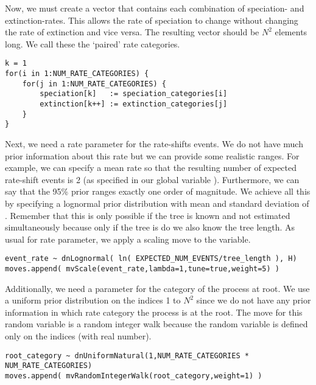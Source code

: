 Now, we must create a vector that contains each combination of speciation- and extinction-rates.
This allows the rate of speciation to change without changing the rate of extinction and vice versa.
The resulting vector should be $N^2$ elements long.
We call these the `paired' rate categories.

{\tt \begin{snugshade*}
\begin{lstlisting}
k = 1
for(i in 1:NUM_RATE_CATEGORIES) {
    for(j in 1:NUM_RATE_CATEGORIES) {
        speciation[k]   := speciation_categories[i]
        extinction[k++] := extinction_categories[j]
    }
}
\end{lstlisting}
\end{snugshade*}}


Next, we need a rate parameter for the rate-shifts events.
We do not have much prior information about this rate but we can provide some realistic ranges.
For example, we can specify a mean rate so that the resulting number of expected rate-shift events is 2 (as specified in our global variable ).
Furthermore, we can say that the 95\% prior ranges exactly one order of magnitude.
We achieve all this by specifying a lognormal prior distribution with mean  and standard deviation of .
Remember that this is only possible if the tree is known and not estimated simultaneously because only if the tree is do we also know the tree length.
As usual for rate parameter, we apply a scaling move to the  variable.
{\tt \begin{snugshade*}
\begin{lstlisting}
event_rate ~ dnLognormal( ln( EXPECTED_NUM_EVENTS/tree_length ), H)
moves.append( mvScale(event_rate,lambda=1,tune=true,weight=5) )
\end{lstlisting}
\end{snugshade*}}

Additionally, we need a parameter for the category of the process at root.
We use a uniform prior distribution on the indices 1 to $N^2$ since we do not have any prior information in which rate category the process is at the root.
The move for this random variable is a random integer walk because the random variable is defined only on the indices (\IE with real number).
{\tt \begin{snugshade*}
\begin{lstlisting}
root_category ~ dnUniformNatural(1,NUM_RATE_CATEGORIES * NUM_RATE_CATEGORIES)
moves.append( mvRandomIntegerWalk(root_category,weight=1) )
\end{lstlisting}
\end{snugshade*}}



